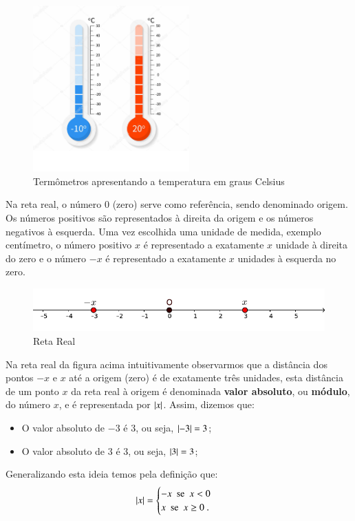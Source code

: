  \begin{figure}[H]
 \centering
 \includegraphics[width=6cm]{Capitulos/Figuras/Termometro.pdf}
 \caption{Termômetros apresentando a temperatura em graus Celsius}
 \end{figure}

 Na reta real, o número $0$ (zero) serve como referência, sendo denominado origem. Os números positivos são representados à direita da origem e os números negativos à esquerda. Uma vez escolhida uma unidade de medida, exemplo centímetro, o número positivo $x$ é representado a exatamente $x$ unidade à direita do zero e o número $-x$ é representado a exatamente $x$ unidades à esquerda no zero.

  \begin{figure}[H]
 \centering
 \includegraphics[width=15cm]{Capitulos/Figuras/RetaReal.pdf}
 \caption{Reta Real}
 \end{figure}

 Na reta real da figura acima intuitivamente observarmos que a distância dos pontos $-x$ e $x$ até a origem (zero) é de exatamente três unidades, esta distância de um ponto $x$ da reta real à origem é denominada \textbf{valor absoluto}, ou \textbf{módulo}, do número $x$, e é representada por $\left|x\right|$. Assim, dizemos que:
\begin{itemize}
\item O valor absoluto de $-3$ é $3$, ou seja, $\left|-3\right|= 3$;
\item O valor absoluto de $3$ é $3$, ou seja, $\left|3\right|= 3$;
\end{itemize}
Generalizando esta ideia temos pela definição que:
\[
\left|x\right|= \begin{cases}
      -x \ \ \text{se} \ \ x<0 \\
      x \ \ \text{se} \ \ x \geq 0 \ .
     \end{cases}
\]

